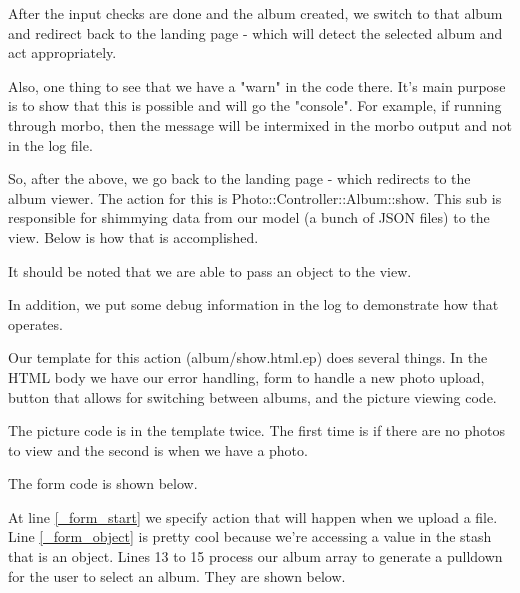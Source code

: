 \documentclass[14pt]{extreport}
\begin{document}


After the input checks are done and the album created, we switch to that album
and redirect back to the landing page - which will detect the selected album
and act appropriately.



Also, one thing to see that we have a "warn" in the code there. It's main
purpose is to show that this is possible and will go the "console". For
example, if running through morbo, then the message will be intermixed in the 
morbo output and not in the log file.

So, after the above, we go back to the landing page - which redirects to the
album viewer.  The action for this is Photo::Controller::Album::show. This sub
is responsible for shimmying data from our model (a bunch of JSON files) to the
view.  Below is how that is accomplished.

It should be noted that we are able to pass an object to the view.



In addition, we put some debug information in the log to demonstrate how that
operates.



Our template for this action (album/show.html.ep) does several things. In the
HTML body we have our error handling, form to handle a new photo upload, button
that allows for switching between albums, and the picture viewing code.  

The picture code is in the template twice.  The first time is if there are no
photos to view and the second is when we have a photo.

The form code is shown below.



At line \ref{_form_start} we specify action that will happen when we upload a
file.  Line \ref{_form_object} is pretty cool because we're accessing a value in
the stash that is an object.  Lines 13 to 15 process our album array to
generate a pulldown for the user to select an album.  They are shown below.
\end{document}
